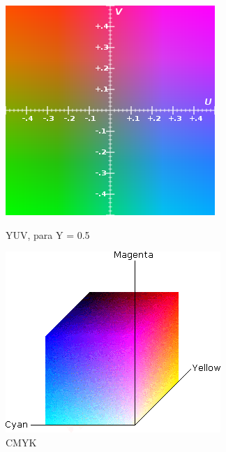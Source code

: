 \begin{figure}[ht]
\begin{minipage}[b]{0.3\linewidth}
        \includegraphics[width=\textwidth]{./imgs/yuvspace.png}
        \caption{YUV, para Y = 0.5}
        \label{fig:yuvspace}
    \end{minipage}
    \hspace{0.5cm}
    \begin{minipage}[b]{0.3\linewidth}
        \centering
        \includegraphics[width=\textwidth]{./imgs/cmykspace.png}
        \caption{CMYK}
        \label{fig:cmykspace}
    \end{minipage}
\end{figure}

